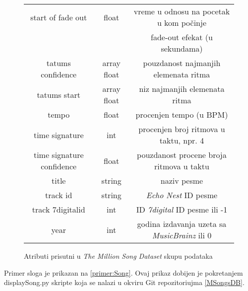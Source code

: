 \begin{figure}
\begin{tabular}{|c|c|c|}
        start of fade out & float & vreme u odnosu na pocetak u kom po\v{c}inje \\
        & & fade-out efekat (u sekundama) \\
        tatums confidence & array float & pouzdanost najmanjih elemenata ritma \\
        tatums start & array float & niz najmanjih elemenata ritma \\
        tempo & float & procenjen tempo (u BPM) \\
        time signature & int & procenjen broj ritmova u taktu, npr. 4 \\
        time signature confidence & float & pouzdanost procene broja ritmova u taktu \\
        title & string & naziv pesme \\
        track id & string & \emph{Echo Nest} ID pesme \\
        track 7digitalid & int & ID \emph{7digital} ID pesme ili -1 \\
        year & int & godina izdavanja uzeta sa \emph{MusicBrainz} ili 0 \\
        \hline
    \end{tabular}
    \label{fig:Atributi}
    \caption{Atributi prisutni u \emph{The Million Song Dataset} skupu podataka}
\end{figure}

Primer sloga je prikazan na \ref{primer:Song}. Ovaj prikaz dobijen je pokretanjem displaySong.py skripte koja se nalazi u okviru Git repozitoriujma \ref{MSongsDB}.


